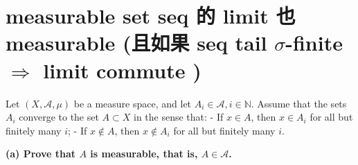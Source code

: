 \documentclass{qlnotes-export}
\begin{document}
\section{\texorpdfstring{measurable set seq 的 limit 也 measurable (且如果 seq tail \(\sigma\)-finite \(\Longrightarrow\) limit commute )}{measurable set seq 的 limit 也 measurable (且如果 seq tail \textbackslash sigma-finite \textbackslash Longrightarrow limit commute )}}\label{measurable-set-seq-ux7684-limit-ux4e5f-measurable-ux4e14ux5982ux679c-seq-tail-sigma-finite-implies-limit-commute}

Let \((X,\mathcal{A},\mu)\) be a measure space, and let \(A_{i} \in \mathcal{A},i \in {\mathbb{N}}\). Assume that the sets \(A_{i}\) converge to the set \(A \subset X\) in the sense that: - If \(x \in A\), then \(x \in A_{i}\) for all but finitely many \(i\); - If \(x \notin A\), then \(x \notin A_{i}\) for all but finitely many \(i\).

\textbf{(a) Prove that \(A\) is measurable, that is, \(A \in \mathcal{A}\).}
\end{document}
